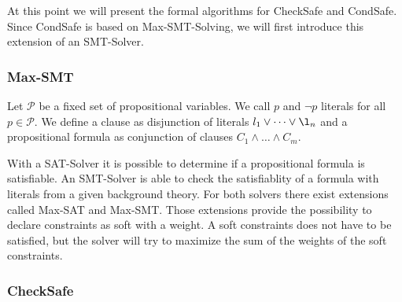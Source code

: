\documentclass[12pt]{scrartcl}
\begin{document}
At this point we will present the formal algorithms for CheckSafe and CondSafe.
Since CondSafe is based on Max-SMT-Solving, we will first introduce this extension of an SMT-Solver.

\subsubsection{Max-SMT}

Let $\mathcal{P}$ be a fixed set of propositional variables.
We call $p$ and $\neg p$ literals for all $p \in \mathcal{P}$.
We define a clause as disjunction of literals $l_1 \vee \dots \vee \l_n$ and a propositional formula as conjunction of clauses $C_1 \wedge \dots \wedge C_m$.

With a SAT-Solver it is possible to determine if a propositional formula is satisfiable.
An SMT-Solver is able to check the satisfiablity of a formula with literals from a given background theory.
For both solvers there exist extensions called Max-SAT and Max-SMT.
Those extensions provide the possibility to declare constraints as soft with a weight.
A soft constraints does not have to be satisfied, but the solver will try to maximize the sum of the weights of the soft constraints.

\subsubsection{CheckSafe}
\end{document}
